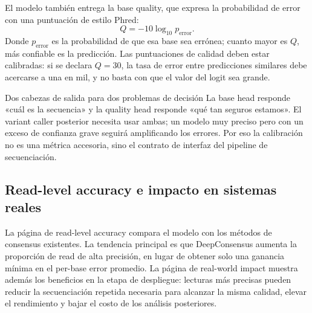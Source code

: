 
El modelo también entrega la base quality, que expresa la probabilidad de error con una puntuación de estilo Phred:
$$
Q=-10\log_{10}p_{\mathrm{error}}.
$$
Donde $p_{\mathrm{error}}$ es la probabilidad de que esa base sea errónea; cuanto mayor es $Q$, más confiable es la predicción. Las puntuaciones de calidad deben estar calibradas: si se declara $Q=30$, la tasa de error entre predicciones similares debe acercarse a una en mil, y no basta con que el valor del logit sea grande.


\begin{importantbox}{Dos cabezas de salida para dos problemas de decisión}
La base head responde «cuál es la secuencia» y la quality head responde «qué tan seguros estamos». El variant caller posterior necesita usar ambas; un modelo muy preciso pero con un exceso de confianza grave seguirá amplificando los errores. Por eso la calibración no es una métrica accesoria, sino el contrato de interfaz del pipeline de secuenciación.
\end{importantbox}

\subsection{Read-level accuracy e impacto en sistemas reales}

La página de read-level accuracy compara el modelo con los métodos de consensus existentes. La tendencia principal es que DeepConsensus aumenta la proporción de read de alta precisión, en lugar de obtener solo una ganancia mínima en el per-base error promedio. La página de real-world impact muestra además los beneficios en la etapa de despliegue: lecturas más precisas pueden reducir la secuenciación repetida necesaria para alcanzar la misma calidad, elevar el rendimiento y bajar el costo de los análisis posteriores.


